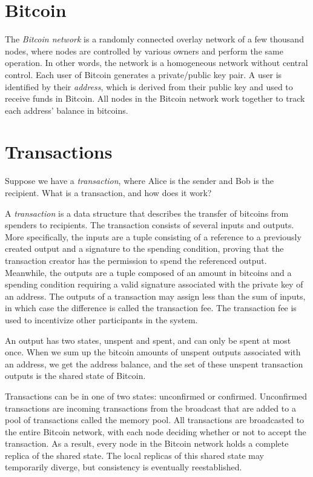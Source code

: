 \documentclass{article}
\begin{document}
\section{Bitcoin}

The \emph{Bitcoin network} is a randomly connected overlay network of a few
thousand nodes, where nodes are controlled by various owners and perform the
same operation. In other words, the network is a homogeneous network without
central control. Each user of Bitcoin generates a private/public key pair. A
user is identified by their \emph{address}, which is derived from their public
key and used to receive funds in Bitcoin. All nodes in the Bitcoin network work
together to track each address' balance in bitcoins.

\section{Transactions}

Suppose we have a \emph{transaction}, where Alice is the sender and Bob is the recipient. What is a transaction, and how does it work?

A \emph{transaction} is a data structure that describes the transfer of bitcoins from spenders to recipients. The transaction consists of several inputs and outputs. More specifically, the inputs are a tuple consisting of a reference to a previously created output and a signature to the spending condition, proving that the transaction creator has the permission to spend the referenced output. Meanwhile, the outputs are a tuple composed of an amount in bitcoins and a spending condition requiring a valid signature associated with the private key of an address. The outputs of a transaction may assign less than the sum of inputs, in which case the difference is called the transaction fee. The transaction fee is used to incentivize other participants in the system.

An output has two states, unspent and spent, and can only be spent at most once. When we sum up the bitcoin amounts of unspent outputs associated with an address, we get the address balance, and the set of these unspent transaction outputs is the shared state of Bitcoin. 

Transactions can be in one of two states: unconfirmed or confirmed. Unconfirmed transactions are incoming transactions from the broadcast that are added to a pool of transactions called the memory pool. All transactions are broadcasted to the entire Bitcoin network, with each node deciding whether or not to accept the transaction. As a result, every node in the Bitcoin network holds a complete replica of the shared state. The local replicas of this shared state may temporarily diverge, but consistency is eventually reestablished. 
\end{document}
